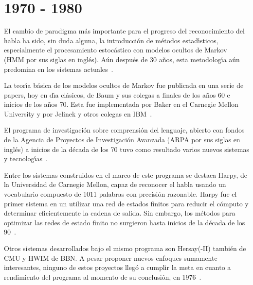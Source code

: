\section{1970 - 1980}
\label{sec:70s}

El cambio de paradigma m\'as importante para el progreso del reconocimiento del habla ha sido, sin duda alguna,
la introducci\'on de m\'etodos estad{\'\i}sticos, especialmente el procesamiento estoc\'astico con modelos ocultos de
Markov (HMM por sus siglas en ingl\'es). A\'un despu\'es de 30 a\~nos, esta metodolog{\'\i}a a\'un predomina en los
sistemas \mbox{actuales \cite{BakerResearch2009}}.

La teor{\'\i}a b\'asica de los modelos ocultos de Markov fue publicada en una serie de papers, hoy en d{\'\i}a cl\'asicos,
de Baum y sus colegas a finales de los a\~nos 60 e inicios de los a\~nos 70. Esta fue implementada por Baker en
el Carnegie Mellon University y por Jelinek y otros colegas en \mbox{IBM \cite{Rabiner89atutorial}}.

El programa de investigaci\'on sobre comprensi\'on del lenguaje, abierto con fondos de la Agencia de Proyectos de Investigaci\'on Avanzada (ARPA por sus siglas en ingl\'es) a inicios de la d\'ecada de los 70 tuvo como 
resultado varios nuevos sistemas y \mbox{tecnolog{\'\i}as \cite{Furui50Years2004}}.

Entre los sistemas construidos en el marco de este programa se destaca Harpy, de la Universidad de Carnegie Mellon,
capaz de reconocer el habla usando un vocabulario compuesto de 1011 palabras con precisi\'on razonable. Harpy fue el
primer sistema en un utilizar una red de estados finitos para reducir el c\'omputo y determinar eficientemente la
cadena de salida. Sin embargo, los m\'etodos para optimizar las redes de estado finito no surgieron hasta inicios de
la d\'ecada de los \mbox{90 \cite{JuangAutomaticSpeech}}.

Otros sistemas desarrollados bajo el mismo programa son Hersay(-II) tambi\'en de CMU y HWIM de BBN. A pesar proponer
nuevos enfoques sumamente interesantes, ninguno de estos proyectos lleg\'o a cumplir la meta en cuanto a rendimiento
del programa al momento de su conclusi\'on, en \mbox{1976 \cite{JuangAutomaticSpeech}}.


